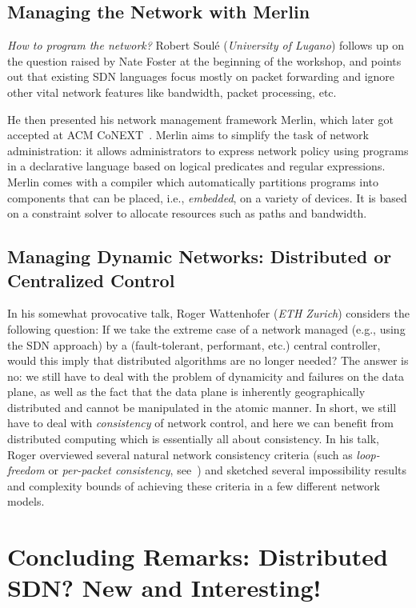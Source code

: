 \documentclass[11pt,pdftex,letter]{article}
\begin{document}
\subsection{Managing the Network with Merlin}

\emph{How to program the network?} Robert Soul\'{e} ({\em University
  of Lugano}) follows up on the question raised by Nate Foster
at the beginning of the workshop, and points out that
existing SDN languages focus mostly
on packet forwarding and
ignore other vital network features like
bandwidth, packet processing, etc.

He then presented his network management framework Merlin, which later got
accepted at ACM CoNEXT~\cite{merlin}. Merlin aims to
simplify the task of network administration: it
allows administrators to express network policy using programs in a declarative language based on logical predicates and regular expressions.
Merlin comes with a compiler which automatically partitions programs into components that can be placed, i.e., \emph{embedded}, on a variety of devices.
It is based on a constraint solver to allocate resources such as paths and bandwidth.

\subsection{Managing Dynamic Networks: Distributed or Centralized
  Control}

In his somewhat provocative talk, Roger Wattenhofer ({\em ETH Zurich}) considers
the following question: If we take the extreme case of a network
managed (e.g., using the SDN approach) by a (fault-tolerant,
performant, etc.) central controller, would this imply
that distributed algorithms are no longer needed? The answer is no: we still have to deal with the problem of
dynamicity and failures on the data plane, as well as the fact that
the data plane is inherently geographically distributed and cannot be
manipulated in the atomic manner. In short, we still have to deal with
\emph{consistency} of network control, and here we can benefit from
distributed computing which is essentially all about consistency.
In his talk, Roger overviewed several natural network consistency
criteria (such as \emph{loop-freedom} or \emph{per-packet
  consistency}, see~\cite{roger-hotnets}) and sketched several impossibility results and
complexity bounds of achieving these criteria in a few different
network models.


\section{Concluding Remarks: Distributed SDN? New and Interesting!}
\end{document}

